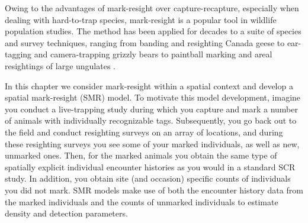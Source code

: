 Owing to the advantages of mark-resight over capture-recapture,
especially when dealing with hard-to-trap species, mark-resight is a
popular tool in wildlife population studies. The method has been
applied for decades
to a suite of species and survey techniques,
ranging from banding and resighting Canada geese
\citep{hestbeck_malecki:1989} to ear-tagging and camera-trapping
grizzly bears \citep{mace_etal:1994} to paintball marking and areal
resightings of large ungulates \citep{skalski_etal:2005jwm}.

In this chapter we consider mark-resight within
a spatial context and
develop a spatial mark-resight (SMR) model. To motivate this model
development, imagine you conduct a live-trapping study during which
you capture and mark a number of animals with individually
recognizable tags. Subsequently, you go back out to the field and
conduct resighting surveys on an array of locations, and during these
resighting surveys you see some of your marked individuals, as well as
new, unmarked ones. Then, for the marked animals you obtain the same
type of spatially explicit individual encounter histories as you would
in a standard SCR study. In addition, you obtain site (and occasion)
specific counts of individuals you did not mark.
SMR models make use of
both the encounter history data from the marked individuals and the
counts of unmarked individuals to estimate density and detection parameters.

